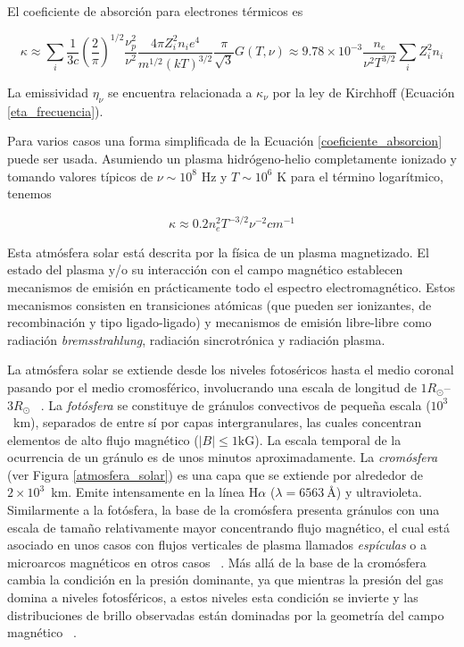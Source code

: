 El coeficiente de absorci\'on para electrones t\'ermicos es

\begin{equation} \label{coeficiente_absorcion}
\kappa \approx \sum_{i} \frac{1}{3c} (\frac{2}{\pi})^{1/2} \frac{\nu_p^2}{\nu^2} \frac{4\pi Z_i^2 n_i e^4}{m^{1/2}(kT)^{3/2}} \frac{\pi}{\sqrt{3}}G(T,\nu) \approx 9.78 \times 10^{-3} \frac{n_e}{\nu^2T^{3/2}} \sum_i Z_i^2 n_i
\end{equation}

La emissividad $\eta_\nu$ se encuentra relacionada a $\kappa_\nu$ por la ley de Kirchhoff (Ecuaci\'on \ref{eta_frecuencia}).

Para varios casos una forma simplificada de la Ecuaci\'on \ref{coeficiente_absorcion} puede ser usada. Asumiendo un plasma hidr\'ogeno-helio completamente ionizado y tomando valores t\'ipicos de $\nu \sim 10^8$ Hz y $T \sim 10^6$ K para el t\'ermino logar\'itmico, tenemos

\begin{equation} \label{coeficiente_absorcion_simple}
\kappa \approx 0.2 n_e^2T^{-3/2} \nu^{-2} cm^{-1}
\end{equation}

Esta atm\'osfera solar est\'a descrita por la f\'isica de un plasma magnetizado. El estado del plasma y/o su interacci\'on con el campo magn\'etico establecen mecanismos de emisi\'on en pr\'acticamente todo el espectro electromagn\'etico. Estos mecanismos consisten en transiciones at\'omicas (que pueden ser ionizantes, de recombinaci\'on y tipo ligado-ligado) y mecanismos de emisi\'on libre-libre como radiaci\'on \emph{bremsstrahlung}, radiaci\'on sincrotr\'onica y radiaci\'on plasma.  ~\citep{ashwanden}

La atm\'osfera solar se extiende desde los niveles fotos\'ericos hasta el medio coronal pasando por el medio cromosf\'erico, involucrando una escala de longitud de $1R_{\odot}$--$3R_{\odot}$ ~\citep{NASAsun}. La \emph{fot\'osfera} se constituye de gr\'anulos convectivos de peque\~na escala ($10^3$~km), separados de entre s\'i por capas intergranulares, las cuales concentran elementos de alto flujo magn\'etico ($|B| \le 1\mbox{kG}$). La escala temporal de la ocurrencia de un gr\'anulo es de unos minutos aproximadamente. La \emph{crom\'osfera} (ver Figura \ref{atmosfera_solar}) es una capa que se extiende por alrededor de $2\times 10^3$~km. Emite intensamente en la l\'inea H$\alpha$ ($\lambda=6563~\mbox{\AA}$) y ultravioleta. Similarmente a la fot\'osfera, la base de la crom\'osfera presenta gr\'anulos con una escala de tama\~no relativamente mayor concentrando flujo magn\'etico, el cual est\'a asociado en unos casos con flujos verticales de plasma llamados \emph{esp\'iculas} o a microarcos magn\'eticos en otros casos ~\citep{NASAweb}. M\'as all\'a de la base de la crom\'osfera cambia la condici\'on en la presi\'on dominante, ya que mientras la presi\'on del gas domina a niveles fotosf\'ericos, a estos niveles esta condici\'on se invierte y las distribuciones de brillo observadas est\'an dominadas por la geometr\'ia del campo magn\'etico ~\citep{priest}.

